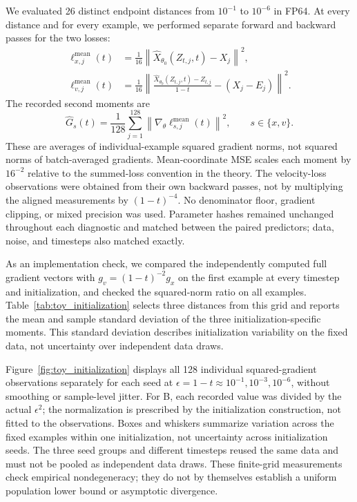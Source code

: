 \documentclass{article}
\theoremstyle{plain}
\theoremstyle{definition}
\theoremstyle{remark}
\newcommand{\norm}[1]{\left\lVert #1\right\rVert}
\begin{document}
We evaluated 26 distinct endpoint distances from $10^{-1}$ to $10^{-6}$ in FP64. At every distance and for every example, we performed separate forward and backward passes for the two losses:
\begin{align}
\ell_{x,j}^{\mathrm{mean}}(t)&=\frac{1}{16}\norm{\hat X_{\theta_0}(Z_{t,j},t)-X_j}^2,\\
\ell_{v,j}^{\mathrm{mean}}(t)&=\frac{1}{16}\norm{\frac{\hat X_{\theta_0}(Z_{t,j},t)-Z_{t,j}}{1-t}-(X_j-E_j)}^2.
\end{align}
The recorded second moments are
\begin{equation}
\widehat G_s(t)=\frac{1}{128}\sum_{j=1}^{128}
\norm{\nabla_\theta\ell_{s,j}^{\mathrm{mean}}(t)}^2,\qquad s\in\{x,v\}.
\end{equation}
These are averages of individual-example squared gradient norms, not squared norms of batch-averaged gradients. Mean-coordinate MSE scales each moment by $16^{-2}$ relative to the summed-loss convention in the theory. The velocity-loss observations were obtained from their own backward passes, not by multiplying the aligned measurements by $(1-t)^{-4}$. No denominator floor, gradient clipping, or mixed precision was used. Parameter hashes remained unchanged throughout each diagnostic and matched between the paired predictors; data, noise, and timesteps also matched exactly.

As an implementation check, we compared the independently computed full gradient vectors with $g_v=(1-t)^{-2}g_x$ on the first example at every timestep and initialization, and checked the squared-norm ratio on all examples. Table~\ref{tab:toy_initialization} selects three distances from this grid and reports the mean and sample standard deviation of the three initialization-specific moments. This standard deviation describes initialization variability on the fixed data, not uncertainty over independent data draws.

Figure~\ref{fig:toy_initialization} displays all 128 individual squared-gradient observations separately for each seed at $\epsilon=1-t\approx10^{-1},10^{-3},10^{-6}$, without smoothing or sample-level jitter. For B, each recorded value was divided by the actual $\epsilon^2$; the normalization is prescribed by the initialization construction, not fitted to the observations. Boxes and whiskers summarize variation across the fixed examples within one initialization, not uncertainty across initialization seeds. The three seed groups and different timesteps reused the same data and must not be pooled as independent data draws. These finite-grid measurements check empirical nondegeneracy; they do not by themselves establish a uniform population lower bound or asymptotic divergence.
\end{document}
